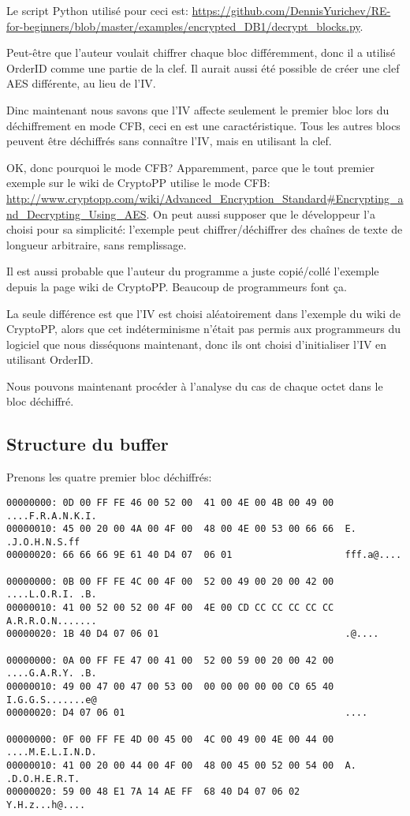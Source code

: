 Le script Python utilisé pour ceci est:
\url{https://github.com/DennisYurichev/RE-for-beginners/blob/master/examples/encrypted_DB1/decrypt_blocks.py}.

Peut-être que l'auteur voulait chiffrer chaque bloc différemment, donc il a utilisé
OrderID comme une partie de la clef.
Il aurait aussi été possible de créer une clef AES différente, au lieu de l'\ac{IV}.

Dinc maintenant nous savons que l'\ac{IV} affecte seulement le premier bloc lors
du déchiffrement en mode \ac{CFB}, ceci en est une caractéristique.
Tous les autres blocs peuvent être déchiffrés sans connaître l'\ac{IV}, mais en utilisant
la clef.

OK, donc pourquoi le mode \ac{CFB}? Apparemment, parce que le tout premier exemple
sur le wiki de CryptoPP utilise le mode \ac{CFB}:
\url{http://www.cryptopp.com/wiki/Advanced_Encryption_Standard#Encrypting_and_Decrypting_Using_AES}.
On peut aussi supposer que le développeur l'a choisi pour sa simplicité:
l'exemple peut chiffrer/déchiffrer des chaînes de texte de longueur arbitraire, sans
remplissage.

Il est aussi probable que l'auteur du programme a juste copié/collé l'exemple depuis
la page wiki de CryptoPP.
Beaucoup de programmeurs font ça.

La seule différence est que l'\ac{IV} est choisi aléatoirement dans l'exemple du
wiki de CryptoPP, alors que cet indéterminisme n'était pas permis aux programmeurs
du logiciel que nous disséquons maintenant, donc ils ont choisi d'initialiser l'\ac{IV}
en utilisant OrderID.

Nous pouvons maintenant procéder à l'analyse du cas de chaque octet dans le bloc
déchiffré.

\subsection{Structure du buffer}

Prenons les quatre premier bloc déchiffrés:

\begin{lstlisting}
00000000: 0D 00 FF FE 46 00 52 00  41 00 4E 00 4B 00 49 00  ....F.R.A.N.K.I.
00000010: 45 00 20 00 4A 00 4F 00  48 00 4E 00 53 00 66 66  E. .J.O.H.N.S.ff
00000020: 66 66 66 9E 61 40 D4 07  06 01                    fff.a@....

00000000: 0B 00 FF FE 4C 00 4F 00  52 00 49 00 20 00 42 00  ....L.O.R.I. .B.
00000010: 41 00 52 00 52 00 4F 00  4E 00 CD CC CC CC CC CC  A.R.R.O.N.......
00000020: 1B 40 D4 07 06 01                                 .@....

00000000: 0A 00 FF FE 47 00 41 00  52 00 59 00 20 00 42 00  ....G.A.R.Y. .B.
00000010: 49 00 47 00 47 00 53 00  00 00 00 00 00 C0 65 40  I.G.G.S.......e@
00000020: D4 07 06 01                                       ....

00000000: 0F 00 FF FE 4D 00 45 00  4C 00 49 00 4E 00 44 00  ....M.E.L.I.N.D.
00000010: 41 00 20 00 44 00 4F 00  48 00 45 00 52 00 54 00  A. .D.O.H.E.R.T.
00000020: 59 00 48 E1 7A 14 AE FF  68 40 D4 07 06 02        Y.H.z...h@....
\end{lstlisting}

